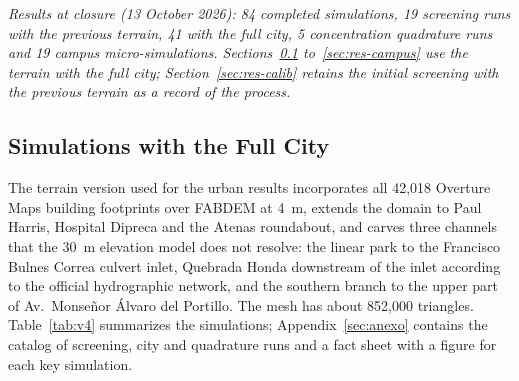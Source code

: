 \emph{Results at closure (13 October 2026): 84 completed simulations, 19 screening runs with the previous terrain, 41 with the full city, 5 concentration quadrature runs and 19 campus micro-simulations. Sections~\ref{sec:res-v4} to~\ref{sec:res-campus} use the terrain with the full city; Section~\ref{sec:res-calib} retains the initial screening with the previous terrain as a record of the process.}

\subsection{Simulations with the Full City}\label{sec:res-v4}
The terrain version used for the urban results incorporates all 42,018 Overture Maps building footprints over FABDEM at \SI{4}{m}, extends the domain to Paul Harris, Hospital Dipreca and the Atenas roundabout, and carves three channels that the \SI{30}{m} elevation model does not resolve: the linear park to the Francisco Bulnes Correa culvert inlet, Quebrada Honda downstream of the inlet according to the official hydrographic network, and the southern branch to the upper part of Av.\ Monseñor Álvaro del Portillo. The mesh has about 852,000 triangles. Table~\ref{tab:v4} summarizes the simulations; Appendix~\ref{sec:anexo} contains the catalog of screening, city and quadrature runs and a fact sheet with a figure for each key simulation.



